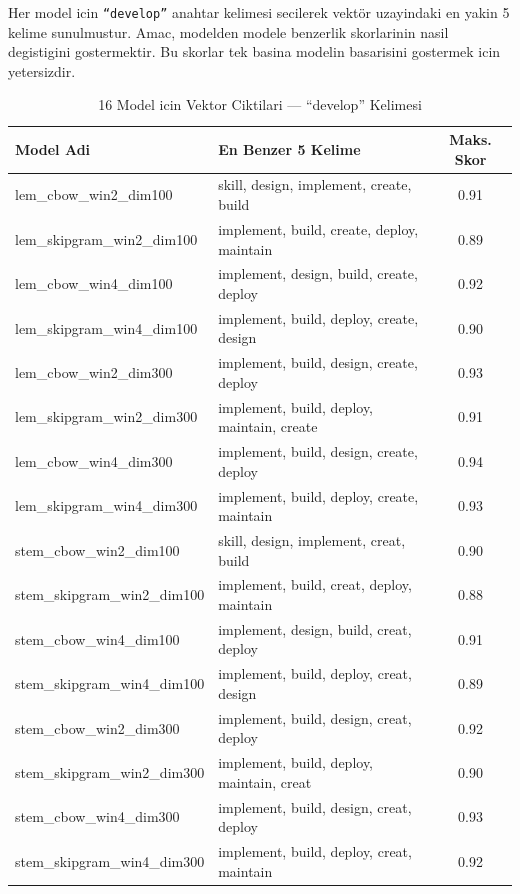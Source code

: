 \documentclass[12pt, a4paper]{article}
\begin{document}
Her model icin \texttt{``develop''} anahtar kelimesi secilerek vektör uzayindaki en yakin 5 kelime sunulmustur.
Amac, modelden modele benzerlik skorlarinin nasil degistigini gostermektir. Bu skorlar tek basina modelin
basarisini gostermek icin yetersizdir.

\begin{table}[H]
\centering
\caption{16 Model icin Vektor Ciktilari --- ``develop'' Kelimesi}
\small
\begin{tabular}{p{5.2cm}p{7cm}c}
\toprule
\textbf{Model Adi} & \textbf{En Benzer 5 Kelime} & \textbf{Maks. Skor} \\
\midrule
lem\_cbow\_win2\_dim100      & skill, design, implement, create, build         & 0.91 \\
lem\_skipgram\_win2\_dim100  & implement, build, create, deploy, maintain      & 0.89 \\
lem\_cbow\_win4\_dim100      & implement, design, build, create, deploy        & 0.92 \\
lem\_skipgram\_win4\_dim100  & implement, build, deploy, create, design        & 0.90 \\
lem\_cbow\_win2\_dim300      & implement, build, design, create, deploy        & 0.93 \\
lem\_skipgram\_win2\_dim300  & implement, build, deploy, maintain, create      & 0.91 \\
lem\_cbow\_win4\_dim300      & implement, build, design, create, deploy        & 0.94 \\
lem\_skipgram\_win4\_dim300  & implement, build, deploy, create, maintain      & 0.93 \\
stem\_cbow\_win2\_dim100     & skill, design, implement, creat, build          & 0.90 \\
stem\_skipgram\_win2\_dim100 & implement, build, creat, deploy, maintain       & 0.88 \\
stem\_cbow\_win4\_dim100     & implement, design, build, creat, deploy         & 0.91 \\
stem\_skipgram\_win4\_dim100 & implement, build, deploy, creat, design         & 0.89 \\
stem\_cbow\_win2\_dim300     & implement, build, design, creat, deploy         & 0.92 \\
stem\_skipgram\_win2\_dim300 & implement, build, deploy, maintain, creat       & 0.90 \\
stem\_cbow\_win4\_dim300     & implement, build, design, creat, deploy         & 0.93 \\
stem\_skipgram\_win4\_dim300 & implement, build, deploy, creat, maintain       & 0.92 \\
\bottomrule
\end{tabular}
\end{table}
\end{document}

